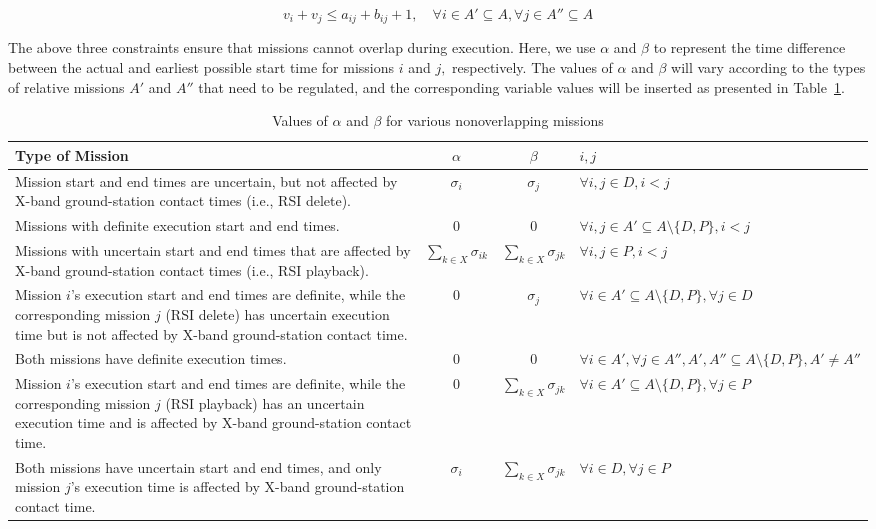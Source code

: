 \documentclass[preprint,3p,12pt,authoryear]{elsarticle}
\begin{document}
\begin{equation}
v_i+v_j \le a_{ij}+b_{ij}+1, \quad \forall i \in A' \subseteq A, \forall j \in A'' \subseteq A \label{eq:nonoverlap3}
\end{equation}

The above three constraints ensure that missions cannot overlap during execution. Here, we use $\alpha$ and $\beta$ to represent the time difference between the actual and earliest possible start time for missions $i$ and $j,$ respectively. The values of $\alpha$ and $\beta$ will vary according to the types of relative missions $A'$ and $A''$ that need to be regulated, and the corresponding variable values will be inserted as presented in Table~\ref{tab:alpha_beta}.

\begin{table}[h!]
\caption{Values of $\alpha$ and $\beta$ for various nonoverlapping missions}
\label{tab:alpha_beta}
\centering
\small
\begin{tabular}{p{}ccp{}}
\toprule
\textbf{Type of Mission} & \textbf{$\alpha$} & \textbf{$\beta$} & \textbf{$i, j$} \\
\midrule
Mission start and end times are uncertain, but not affected by X-band ground-station contact times (i.e., RSI delete). & $\sigma_i$ & $\sigma_j$ & $\forall i, j \in D, i<j$ \\
Missions with definite execution start and end times. & 0 & 0 & $\forall i, j \in A' \subseteq A \setminus \{D, P\}, i<j$ \\
Missions with uncertain start and end times that are affected by X-band ground-station contact times (i.e., RSI playback). & $\sum_{k \in X} \sigma_{ik}$ & $\sum_{k \in X} \sigma_{jk}$ & $\forall i, j \in P, i<j$ \\
Mission $i$'s execution start and end times are definite, while the corresponding mission $j$ (RSI delete) has uncertain execution time but is not affected by X-band ground-station contact time. & 0 & $\sigma_j$ & $\forall i \in A' \subseteq A \setminus \{D,P\}, \forall j \in D$ \\
Both missions have definite execution times. & 0 & 0 & $\forall i \in A', \forall j \in A'', A', A'' \subseteq A \setminus \{D, P\}, A' \neq A''$ \\
Mission $i$'s execution start and end times are definite, while the corresponding mission $j$ (RSI playback) has an uncertain execution time and is affected by X-band ground-station contact time. & 0 & $\sum_{k \in X} \sigma_{jk}$ & $\forall i \in A' \subseteq A \setminus \{D,P\}, \forall j \in P$ \\
Both missions have uncertain start and end times, and only mission $j$'s execution time is affected by X-band ground-station contact time. & $\sigma_i$ & $\sum_{k \in X} \sigma_{jk}$ & $\forall i \in D, \forall j \in P$ \\
\bottomrule
\end{tabular}
\end{table}
\end{document}
